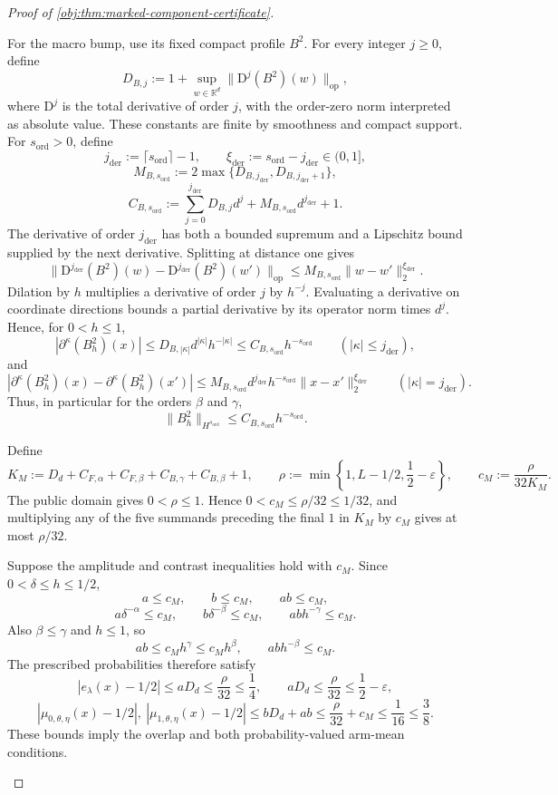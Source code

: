 \documentclass[11pt]{article}
\begin{document}
\begin{proof}[Proof of \cref{obj:thm:marked-component-certificate}]
\begin{enumerate}
For the macro bump, use its fixed compact profile \(B^2\). For every integer \(j\ge0\), define
\[
D_{B,j}:=
1+\sup_{w\in\mathbb R^d}\|\mathrm D^j(B^2)(w)\|_{\mathrm{op}},
\]
where \(\mathrm D^j\) is the total derivative of order \(j\), with the order-zero norm interpreted as absolute value. These constants are finite by smoothness and compact support. For \(s_{\mathrm{ord}}>0\), define
\[
j_{\mathrm{der}}:=\lceil s_{\mathrm{ord}}\rceil-1,
\qquad
\xi_{\mathrm{der}}:=s_{\mathrm{ord}}-j_{\mathrm{der}}\in(0,1],
\]
\[
M_{B,s_{\mathrm{ord}}}
:=
2\max\{D_{B,j_{\mathrm{der}}},D_{B,j_{\mathrm{der}}+1}\},
\]
\[
C_{B,s_{\mathrm{ord}}}
:=
\sum_{j=0}^{j_{\mathrm{der}}}D_{B,j}d^j
+
M_{B,s_{\mathrm{ord}}}d^{j_{\mathrm{der}}}+1.
\]
The derivative of order \(j_{\mathrm{der}}\) has both a bounded supremum and a Lipschitz bound supplied by the next derivative. Splitting at distance one gives
\[
\|\mathrm D^{j_{\mathrm{der}}}(B^2)(w)
-\mathrm D^{j_{\mathrm{der}}}(B^2)(w')\|_{\mathrm{op}}
\le
M_{B,s_{\mathrm{ord}}}\|w-w'\|_2^{\xi_{\mathrm{der}}}.
\]
Dilation by \(h\) multiplies a derivative of order \(j\) by \(h^{-j}\). Evaluating a derivative on coordinate directions bounds a partial derivative by its operator norm times \(d^j\). Hence, for \(0<h\le1\),
\[
|\partial^\kappa(B_h^2)(x)|
\le D_{B,|\kappa|}d^{|\kappa|}h^{-|\kappa|}
\le C_{B,s_{\mathrm{ord}}}h^{-s_{\mathrm{ord}}}
\qquad (|\kappa|\le j_{\mathrm{der}}),
\]
and
\[
|\partial^\kappa(B_h^2)(x)-\partial^\kappa(B_h^2)(x')|
\le
M_{B,s_{\mathrm{ord}}}d^{j_{\mathrm{der}}}
h^{-s_{\mathrm{ord}}}\|x-x'\|_2^{\xi_{\mathrm{der}}}
\qquad (|\kappa|=j_{\mathrm{der}}).
\]
Thus, in particular for the orders \(\beta\) and \(\gamma\),
\[
\|B_h^2\|_{H^{s_{\mathrm{ord}}}}
\le C_{B,s_{\mathrm{ord}}}h^{-s_{\mathrm{ord}}}.
\]

Define
\[
K_M:=
D_d+C_{F,\alpha}+C_{F,\beta}
+C_{B,\gamma}+C_{B,\beta}+1,
\qquad
\rho:=\min\left\{1,L-1/2,\frac12-\varepsilon\right\},
\qquad
c_M:=\frac{\rho}{32K_M}.
\]
The public domain gives \(0<\rho\le1\). Hence \(0<c_M\le\rho/32\le1/32\), and multiplying any of the five summands preceding the final \(1\) in \(K_M\) by \(c_M\) gives at most \(\rho/32\).

Suppose the amplitude and contrast inequalities hold with \(c_M\). Since \(0<\delta\le h\le1/2\),
\[
a\le c_M,\qquad b\le c_M,\qquad ab\le c_M,
\]
\[
a\delta^{-\alpha}\le c_M,\qquad
b\delta^{-\beta}\le c_M,\qquad
ab h^{-\gamma}\le c_M.
\]
Also \(\beta\le\gamma\) and \(h\le1\), so
\[
ab\le c_Mh^\gamma\le c_Mh^\beta,
\qquad
ab h^{-\beta}\le c_M.
\]
The prescribed probabilities therefore satisfy
\[
|e_\lambda(x)-1/2|
\le aD_d\le\frac{\rho}{32}\le\frac14,
\qquad
aD_d\le\frac{\rho}{32}\le\frac12-\varepsilon,
\]
\[
|\mu_{0,\theta,\eta}(x)-1/2|,
\ |\mu_{1,\theta,\eta}(x)-1/2|
\le bD_d+ab
\le\frac{\rho}{32}+c_M\le\frac1{16}\le\frac38.
\]
These bounds imply the overlap and both probability-valued arm-mean conditions.


\end{enumerate}
\end{proof}
\end{document}
